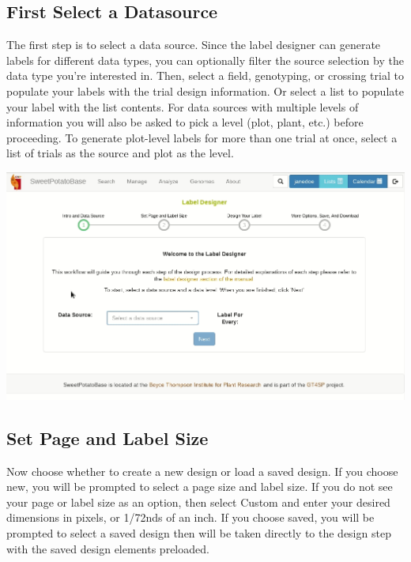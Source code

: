 \documentclass[
  12pt,
]{book}
\begin{document}
\hypertarget{first-select-a-datasource}{%
\subsection{First Select a Datasource}\label{first-select-a-datasource}}

The first step is to select a data source. Since the label designer can generate labels for different data types, you can optionally filter the source selection by the data type you're interested in. Then, select a field, genotyping, or crossing trial to populate your labels with the trial design information. Or select a list to populate your label with the list contents. For data sources with multiple levels of information you will also be asked to pick a level (plot, plant, etc.) before proceeding. To generate plot-level labels for more than one trial at once, select a list of trials as the source and plot as the level.

\begin{center}\includegraphics[width=0.95\linewidth]{assets/gifs/gif1} \end{center}

\hypertarget{set-page-and-label-size}{%
\subsection{Set Page and Label Size}\label{set-page-and-label-size}}

Now choose whether to create a new design or load a saved design. If you choose new, you will be prompted to select a page size and label size. If you do not see your page or label size as an option, then select Custom and enter your desired dimensions in pixels, or 1/72nds of an inch. If you choose saved, you will be prompted to select a saved design then will be taken directly to the design step with the saved design elements preloaded.
\end{document}
